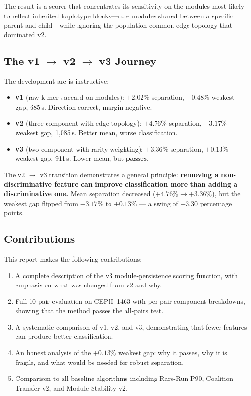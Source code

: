 \documentclass{../yalumba}
\begin{document}
The result is a scorer that concentrates its sensitivity on the modules most
likely to reflect inherited haplotype blocks---rare modules shared between a
specific parent and child---while ignoring the population-common edge topology
that dominated v2.

\subsection{The v1 $\to$ v2 $\to$ v3 Journey}

The development arc is instructive:

\begin{itemize}
  \item \textbf{v1} (raw k-mer Jaccard on modules):  $+2.02\%$ separation,
        $-0.48\%$ weakest gap, 685\,s.  Direction correct, margin negative.
  \item \textbf{v2} (three-component with edge topology):  $+4.76\%$
        separation, $-3.17\%$ weakest gap, 1{,}085\,s.  Better mean, worse
        classification.
  \item \textbf{v3} (two-component with rarity weighting):  $+3.36\%$
        separation, $+0.13\%$ weakest gap, 911\,s.  Lower mean, but
        \textbf{passes}.
\end{itemize}

\begin{keyfinding}
The v2 $\to$ v3 transition demonstrates a general principle: \textbf{removing
a non-discriminative feature can improve classification more than adding a
discriminative one.}  Mean separation decreased ($+4.76\% \to +3.36\%$), but
the weakest gap flipped from $-3.17\%$ to $+0.13\%$ --- a swing of $+3.30$
percentage points.
\end{keyfinding}

\subsection{Contributions}

This report makes the following contributions:

\begin{enumerate}
  \item A complete description of the v3 module-persistence scoring function,
        with emphasis on what was changed from v2 and why.
  \item Full 10-pair evaluation on CEPH~1463 with per-pair component
        breakdowns, showing that the method passes the all-pairs test.
  \item A systematic comparison of v1, v2, and v3, demonstrating that fewer
        features can produce better classification.
  \item An honest analysis of the $+0.13\%$ weakest gap: why it passes, why it
        is fragile, and what would be needed for robust separation.
  \item Comparison to all baseline algorithms including Rare-Run P90,
        Coalition Transfer v2, and Module Stability v2.
\end{enumerate}
\end{document}
